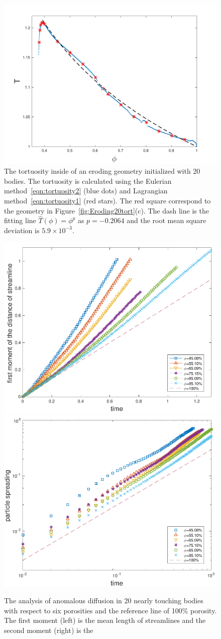 \documentclass[preprint, 10pt]{elsarticle}
\begin{document}
\begin{figure}[H]
\center
\includegraphics*[width =0.5\linewidth]{./figs/tort_eulerian}
\caption{\label{fig:Eroding20tort_all} The tortuosity inside of an
eroding geometry initialized with 20 bodies.  The tortuosity is
calculated using the Eulerian method~\eqref{eqn:tortuosity2} (blue dots)
and Lagrangian method~\eqref{eqn:tortuosity1} (red stars).  The red
square correspond to the geometry in Figure~\ref{fig:Eroding20tort}(c).
The dash line is the fitting line $\hat{T}(\phi)=\phi^p$ as $p=-0.2064$ and 
the root mean square deviation is $5.9 \times 10^{-3}$.}
\end{figure}



\begin{figure}[H]
\includegraphics*[width =0.45\linewidth]{./figs/20b_first_moment}
\includegraphics*[width =0.45\linewidth]{./figs/20b_second_moment}
\caption{\label{fig:Eroding20anomalous} The analysis of anomalous diffusion in
 20 nearly touching bodies with respect to six porosities and the reference line of 100\% porosity.
The first moment (left) is the mean length of streamlines and the second moment (right) is the }
\end{figure}
\end{document}
